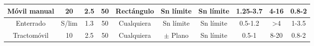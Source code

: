 \begin{table}[h!]
\begin{turn}{90}
\begin{tabular}{c|c|c|c|c|c|c|c|c|c}
			\multicolumn{1}{|c|}{Móvil manual}                                               & \multicolumn{1}{c|}{20}                                                                   & \multicolumn{1}{c|}{2.5}                                                               & \multicolumn{1}{c|}{50}  & \multicolumn{1}{c|}{Rectángulo}                                                  & \multicolumn{1}{c|}{Sn límite}                                                      & \multicolumn{1}{c|}{Sn límite}                                                         & \multicolumn{1}{c|}{1.25-3.7}                                                      & \multicolumn{1}{c|}{4-16}                                                         & \multicolumn{1}{c|}{0.8-2}                                                                \\ \midrule
			\multicolumn{1}{|c|}{Enterrado}                                                  & \multicolumn{1}{c|}{S/lim}                                                                & \multicolumn{1}{c|}{1.3}                                                               & \multicolumn{1}{c|}{50}  & \multicolumn{1}{c|}{Cualquiera}                                                  & \multicolumn{1}{c|}{Sn límite}                                                      & \multicolumn{1}{c|}{Sn límite}                                                         & \multicolumn{1}{c|}{0.5-1.2}                                                       & \multicolumn{1}{c|}{\textgreater{}4}                                              & \multicolumn{1}{c|}{1-3.5}                                                                \\ \midrule
			\multicolumn{1}{|c|}{Tractomóvil}                                                & \multicolumn{1}{c|}{10}                                                                   & \multicolumn{1}{c|}{2.5}                                                               & \multicolumn{1}{c|}{50}  & \multicolumn{1}{c|}{Cualquiera}                                                  & \multicolumn{1}{c|}{$\pm$ Plano}                                                    & \multicolumn{1}{c|}{Sn límite}                                                         & \multicolumn{1}{c|}{0.5-1}                                                         & \multicolumn{1}{c|}{8-20}                                                         & \multicolumn{1}{c|}{0.8-2}                                                                \\ \midrule

\end{tabular}
\end{turn}
\end{table}
